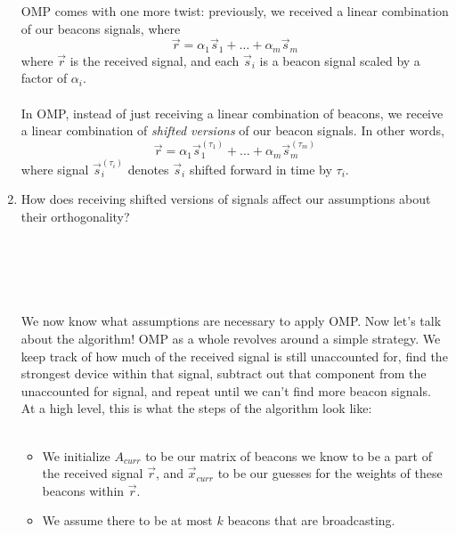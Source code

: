 \begin{enumerate}
    OMP comes with one more twist: previously, we received a linear combination of our beacons signals, where
    $$ \vec{r} = \alpha_1\vec{s}_1 + \dots + \alpha_m\vec{s}_m $$
    where $\vec{r}$ is the received signal, and each $\vec{s}_i$ is a beacon signal scaled by a factor of $\alpha_i$.
    \\ \\
    In OMP, instead of just receiving a linear combination of beacons, we receive a linear
    combination of \textit{shifted versions} of our beacon signals. In other words,
    $$ \vec{r} = \alpha_1\vec{s}_1^{(\tau_1)} + \dots + \alpha_m\vec{s}_m^{(\tau_m)} $$
    where signal $\vec{s}_i^{(\tau_i)}$ denotes $\vec{s}_i$ shifted forward in time by $\tau_i$.
    \item How does receiving shifted versions of signals affect our assumptions about their orthogonality?
    \\ \\
    \answerbox{0.5cm}
    \\ \\
    \\ \\
    We now know what assumptions are necessary to apply OMP. Now let's talk about the algorithm!
    OMP as a whole revolves around a simple strategy. We keep track of how much of the received signal is
    still unaccounted for, find the strongest device within that signal, subtract out that component from
    the unaccounted for signal, and repeat until we can't find more beacon signals.
    At a high level, this is what the steps of the algorithm look like:
    \\ \\
    \begin{itemize}
        \item We initialize $A_{curr}$ to be our matrix of beacons we know to be a part of the received signal $\vec{r}$,
        and $\vec{x}_{curr}$ to be our guesses for the weights of these beacons within $\vec{r}$.
        \item We assume there to be at most $k$ beacons that are broadcasting.

\end{itemize}
\end{enumerate}
